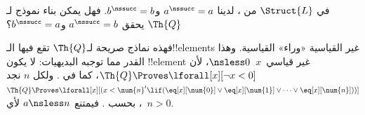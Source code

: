 \documentclass[../../../include/open-logic-section]{subfiles}
\begin{document}
\begin{prob}
في $\Struct{L}$ من ، لدينا
$a^\nssucc=a$ و$b^\nssucc=b$. فهل يمكن بناء نموذج لـ$\Th{Q}$ يحقق
$a^\nssucc=b$ و$b^\nssucc=a$؟
\end{prob}

\begin{explain}
فهذه نماذج صريحة لـ$\Th{Q}$ تقع فيها الـ!!{element}s
غير القياسية «وراء» القياسية. وهذا القدر مما توجبه
البديهيات: لا يكون !!{element} غير قياسي~$x$~${} \nsless 0$،
لأن $\Th{Q} \Proves \lforall[x][\lnot x<0]$، كما في
. ولكل $n$ نجد
$\Th{Q} \Proves \lforall[x][(x < \num{n}' \lif
(\eq[x][\num{0}] \lor \eq[x][\num{1}] \lor \dots \lor
\eq[x][\num{n}]))]$، بحسب .
فيمتنع $a \nsless n$ لأي~$n>0$.
\end{explain}
\end{document}
